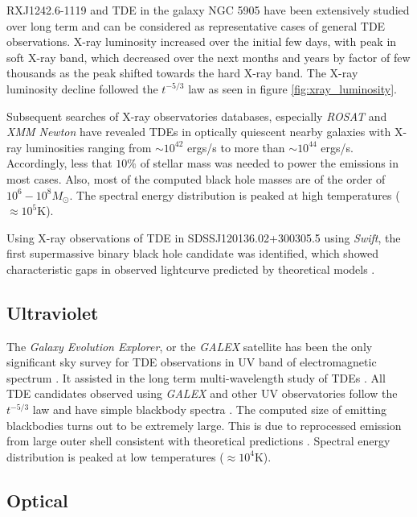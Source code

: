 \documentclass{tda}
\begin{document}
RXJ1242.6-1119 and TDE in the galaxy NGC 5905 have been extensively studied over long term and can be considered as representative cases of general TDE observations. X-ray luminosity increased over the initial few days, with peak in soft X-ray band, which decreased over the next months and years by factor of few thousands as the peak shifted towards the hard X-ray band. The X-ray luminosity decline followed the \(t^{-5/3}\) law \cite{komossa_tidal_2015} as seen in figure \ref{fig:xray_luminosity}.

Subsequent searches of X-ray observatories databases, especially \textit{ROSAT} and \textit{XMM Newton} have revealed TDEs in optically quiescent nearby galaxies \cite[see references in][]{komossa_tidal_2015} with X-ray luminosities ranging from \(\sim 10^{42}\) ergs/s to more than \(\sim 10^{44}\) ergs/s. Accordingly, less that \(10\%\) of stellar mass was needed to power the emissions in most cases. Also, most of the computed black hole masses are of the order of \(10^6 - 10^8 M_{\odot}\). The spectral energy distribution is peaked at high temperatures (\(\approx 10^5\)K).

Using X-ray observations of TDE in SDSSJ120136.02+300305.5 using \textit{Swift}, the first supermassive binary black hole candidate was identified, which showed characteristic gaps in observed lightcurve predicted by theoretical models \cite{liu_miliparsec_2014}.


\subsection{Ultraviolet} \label{multiwave:uv}

The \textit{Galaxy Evolution Explorer}, or the \textit{GALEX} satellite has been the only significant sky survey for TDE observations in UV band of electromagnetic spectrum \cite{van_velzen_optical-ultraviolet_2020}. It assisted in the long term multi-wavelength study of TDEs \cite{gezari_ultraviolet_2006}. All TDE candidates observed using \textit{GALEX} and other UV observatories follow the \(t^{-5/3}\) law and have simple blackbody spectra \cite{nicholas_chamberlain_stone_tidal_2013}. The computed size of emitting blackbodies turns out to be extremely large. This is due to reprocessed emission from large outer shell consistent with theoretical predictions \cite{ulmer_flares_1999}. Spectral energy distribution is peaked at low temperatures (\(\approx 10^4\)K).

\subsection{Optical} \label{multiwave:optical}
\end{document}
